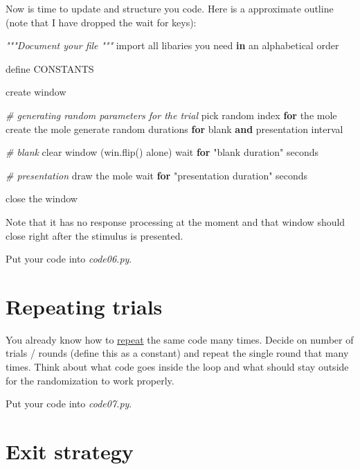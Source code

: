 \documentclass[
]{book}
\newenvironment{Shaded}{\begin{snugshade}}{\end{snugshade}}
\newcommand{\BuiltInTok}[1]{#1}
\newcommand{\CommentTok}[1]{\textcolor[rgb]{0.56,0.35,0.01}{\textit{#1}}}
\newcommand{\ControlFlowTok}[1]{\textcolor[rgb]{0.13,0.29,0.53}{\textbf{#1}}}
\newcommand{\ImportTok}[1]{#1}
\newcommand{\KeywordTok}[1]{\textcolor[rgb]{0.13,0.29,0.53}{\textbf{#1}}}
\newcommand{\NormalTok}[1]{#1}
\newcommand{\StringTok}[1]{\textcolor[rgb]{0.31,0.60,0.02}{#1}}
\begin{document}
Now is time to update and structure you code. Here is a approximate outline (note that I have dropped the wait for keys):

\begin{Shaded}
\begin{Highlighting}[]
\CommentTok{"""Document your file}
\CommentTok{"""}
\ImportTok{import} \BuiltInTok{all}\NormalTok{ libaries you need }\KeywordTok{in}\NormalTok{ an alphabetical order}

\NormalTok{define CONSTANTS}

\NormalTok{create window}

\CommentTok{\# generating random parameters for the trial}
\NormalTok{pick random index }\ControlFlowTok{for}\NormalTok{ the mole}
\NormalTok{create the mole}
\NormalTok{generate random durations }\ControlFlowTok{for}\NormalTok{ blank }\KeywordTok{and}\NormalTok{ presentation interval}

\CommentTok{\# blank}
\NormalTok{clear window (win.flip() alone)}
\NormalTok{wait }\ControlFlowTok{for} \StringTok{"blank duration"}\NormalTok{ seconds}

\CommentTok{\# presentation}
\NormalTok{draw the mole}
\NormalTok{wait }\ControlFlowTok{for} \StringTok{"presentation duration"}\NormalTok{ seconds}

\NormalTok{close the window}
\end{Highlighting}
\end{Shaded}

Note that it has no response processing at the moment and that window should close right after the stimulus is presented.

Put your code into \emph{code06.py}.

\hypertarget{repeating-trials}{%
\section{Repeating trials}\label{repeating-trials}}

You already know how to \protect\hyperlink{range}{repeat} the same code many times. Decide on number of trials / rounds (define this as a constant) and repeat the single round that many times. Think about what code goes inside the loop and what should stay outside for the randomization to work properly.

Put your code into \emph{code07.py}.

\hypertarget{waitKeys-maxwait}{%
\section{Exit strategy}\label{waitKeys-maxwait}}
\end{document}
